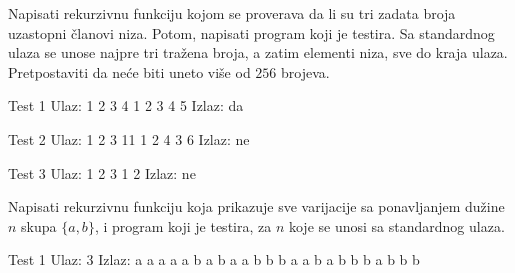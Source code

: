 \begin{Exercise}[label=114]
Napisati rekurzivnu funkciju kojom se proverava da li su tri
  zadata broja uzastopni članovi niza. Potom, napisati program koji
  je testira. Sa standardnog ulaza se unose najpre tri tražena
  broja, a zatim elementi niza, sve do kraja ulaza. Pretpostaviti da
neće biti uneto više od $256$ brojeva.
  
\begin{miditest}
\begin{test}{Test 1}
Ulaz:     1 2 3 4 1 2 3 4 5 
Izlaz:    da                     
\end{test}
\end{miditest}
\begin{miditest}
\begin{test}{Test 2}
Ulaz:     1 2 3 11 1 2 4 3 6 
Izlaz:    ne                    
\end{test}
\end{miditest}

\begin{miditest}
\begin{test}{Test 3}
Ulaz:     1 2 3 1 2
Izlaz:    ne 
\end{test}
\end{miditest}
\end{Exercise}
\begin{Answer}[ref=114]
\end{Answer}




\begin{Exercise}[label=116]
Napisati rekurzivnu funkciju koja prikazuje sve varijacije sa
   ponavljanjem dužine $n$ skupa $\{a, b\}$, i program koji je
   testira, za $n$ koje se unosi sa standardnog ulaza.

\begin{miditest}
\begin{test}{Test 1}
Ulaz:    3
Izlaz:   a a a
         a a b
         a b a
         a b b
         b a a
         b a b
         b b a
         b b b
\end{test}
\end{miditest}
\end{Exercise}

